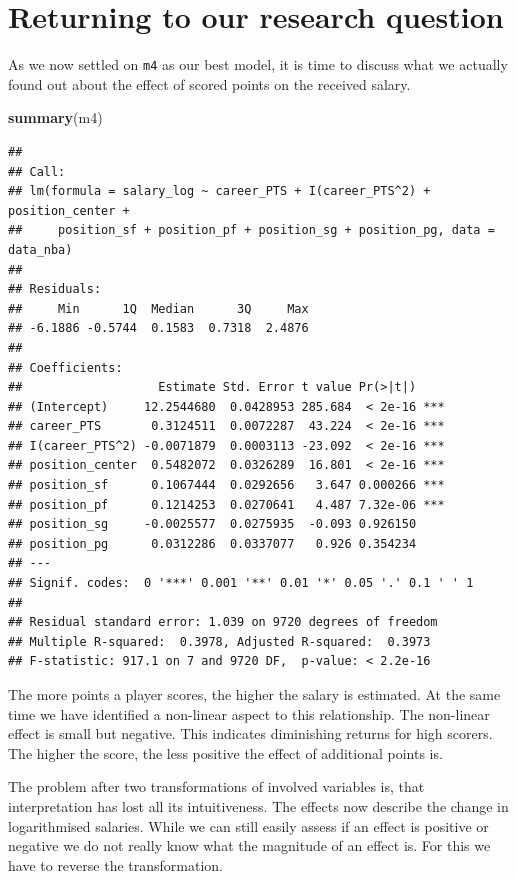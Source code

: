 \documentclass[
]{book}
\newenvironment{Shaded}{\begin{snugshade}}{\end{snugshade}}
\newcommand{\FunctionTok}[1]{\textcolor[rgb]{0.13,0.29,0.53}{\textbf{#1}}}
\newcommand{\NormalTok}[1]{#1}
\begin{document}
\hypertarget{returning-to-our-research-question-2}{%
\section{Returning to our research question}\label{returning-to-our-research-question-2}}

As we now settled on \texttt{m4} as our best model, it is time to discuss what
we actually found out about the effect of scored points on the received
salary.

\begin{Shaded}
\begin{Highlighting}[]
\FunctionTok{summary}\NormalTok{(m4)}
\end{Highlighting}
\end{Shaded}

\begin{verbatim}
## 
## Call:
## lm(formula = salary_log ~ career_PTS + I(career_PTS^2) + position_center + 
##     position_sf + position_pf + position_sg + position_pg, data = data_nba)
## 
## Residuals:
##     Min      1Q  Median      3Q     Max 
## -6.1886 -0.5744  0.1583  0.7318  2.4876 
## 
## Coefficients:
##                   Estimate Std. Error t value Pr(>|t|)    
## (Intercept)     12.2544680  0.0428953 285.684  < 2e-16 ***
## career_PTS       0.3124511  0.0072287  43.224  < 2e-16 ***
## I(career_PTS^2) -0.0071879  0.0003113 -23.092  < 2e-16 ***
## position_center  0.5482072  0.0326289  16.801  < 2e-16 ***
## position_sf      0.1067444  0.0292656   3.647 0.000266 ***
## position_pf      0.1214253  0.0270641   4.487 7.32e-06 ***
## position_sg     -0.0025577  0.0275935  -0.093 0.926150    
## position_pg      0.0312286  0.0337077   0.926 0.354234    
## ---
## Signif. codes:  0 '***' 0.001 '**' 0.01 '*' 0.05 '.' 0.1 ' ' 1
## 
## Residual standard error: 1.039 on 9720 degrees of freedom
## Multiple R-squared:  0.3978, Adjusted R-squared:  0.3973 
## F-statistic: 917.1 on 7 and 9720 DF,  p-value: < 2.2e-16
\end{verbatim}

The more points a player scores, the higher the salary is estimated. At
the same time we have identified a non-linear aspect to this
relationship. The non-linear effect is small but negative. This
indicates diminishing returns for high scorers. The higher the score,
the less positive the effect of additional points is.

The problem after two transformations of involved variables is, that
interpretation has lost all its intuitiveness. The effects now describe
the change in logarithmised salaries. While we can still easily assess
if an effect is positive or negative we do not really know what the
magnitude of an effect is. For this we have to reverse the
transformation.
\end{document}
